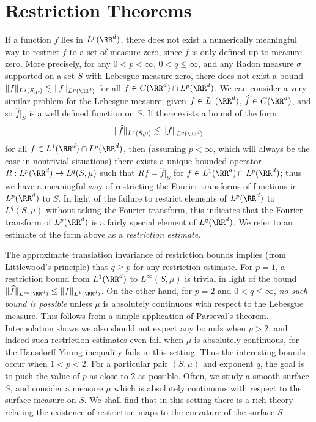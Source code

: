 \chapter{Restriction Theorems}

If a function $f$ lies in $L^p(\RR^d)$, there does not exist a numerically meaningful way to restrict $f$ to a set of measure zero, since $f$ is only defined up to measure zero. More precisely, for any $0 < p < \infty$, $0 < q \leq \infty$, and any Radon measure $\sigma$ supported on a set $S$ with Lebesgue measure zero, there does not exist a bound $\| f \|_{L^q(S,\mu)} \lesssim \| f \|_{L^p(\RR^d)}$ for all $f \in C(\RR^d) \cap L^p(\RR^d)$. We can consider a very similar problem for the Lebesgue measure; given $f \in L^1(\RR^d)$, $\widehat{f} \in C(\RR^d)$, and so $\widehat{f}|_S$ is a well defined function on $S$. If there exists a bound of the form
%
\begin{equation} \label{restrictionestimate}
  \| \widehat{f} \|_{L^q(S,\mu)} \lesssim \| f \|_{L^p(\RR^d)}
\end{equation}
%
for all $f \in L^1(\RR^d) \cap L^p(\RR^d)$, then (assuming $p < \infty$, which will always be the case in nontrivial situations) there exists a unique bounded operator $R: L^p(\RR^d) \to L^q(S,\mu)$ such that $Rf = \widehat{f}|_S$ for $f \in L^1(\RR^d) \cap L^p(\RR^d)$; thus we have a meaningful way of restricting the Fourier transforms of functions in $L^p(\RR^d)$ to $S$. In light of the failure to restrict elements of $L^p(\RR^d)$ to $L^q(S,\mu)$ without taking the Fourier transform, this indicates that the Fourier transform of $L^p(\RR^d)$ is a fairly special element of $L^q(\RR^d)$. We refer to an estimate of the form above as a \emph{restriction estimate}.

The approximate translation invariance of restriction bounds implies (from Littlewood's principle) that $q \geq p$ for any restriction estimate. For $p = 1$, a restriction bound from $L^1(\RR^d)$ to $L^\infty(S,\mu)$ is trivial in light of the bound $\| \widehat{f} \|_{L^\infty(\RR^d)} \leq \| f \|_{L^1(\RR^d)}$. On the other hand, for $p = 2$ and $0 < q \leq \infty$, \emph{no such bound is possible} unless $\mu$ is absolutely continuous with respect to the Lebesgue measure. This follows from a simple application of Parseval's theorem. Interpolation shows we also should not expect any bounds when $p > 2$, and indeed such restriction estimates even fail when $\mu$ is absolutely continuous, for the Hausdorff-Young inequality fails in this setting. Thus the interesting bounds occur when $1 < p < 2$. For a particular pair $(S,\mu)$ and exponent $q$, the goal is to push the value of $p$ as close to $2$ as possible. Often, we study a smooth surface $S$, and consider a measure $\mu$ which is absolutely continuous with respect to the surface measure on $S$. We shall find that in this setting there is a rich theory relating the existence of restriction maps to the curvature of the surface $S$.

